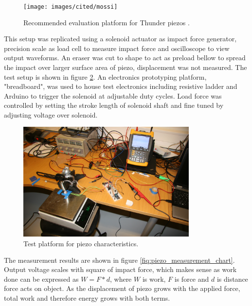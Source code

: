 \begin{figure}[htb]
  \begin{center}
  \texttt{[image: images/cited/mossi]}
  \end{center}
  \caption{Recommended evaluation platform for Thunder piezos \cite{Mossi}.}
  \label{fiq:thunder_eval}
\end{figure}

This setup was replicated using a solenoid actuator as impact force generator, precision scale as load cell to measure impact force and oscilloscope to view output waveforms. An eraser was cut to shape to act as preload bellow to spread the impact over larger surface area of piezo, displacement was not measured. The test setup is shown in figure \ref{fiq:piezo_impact}. An electronics prototyping platform, "breadboard", was used to house test electronics including resistive ladder and Arduino to trigger the solenoid at adjustable duty cycles. Load force was controlled by setting the stroke length of solenoid shaft and fine tuned by adjusting voltage over solenoid. 

\begin{figure}[htb]
  \begin{center}
  \includegraphics[height=6cm]{images/own_pic/piezo_test}
  \end{center}
  \caption{Test platform for piezo characteristics.}
  \label{fiq:piezo_impact}
\end{figure}

The measurement results are shown in figure \ref{fiq:piezo_measurement_chart}. Output voltage scales with square of impact force, which makes sense as work done can be expressed as $W = F * d$, where $W$ is work, $F$ is force and $d$ is distance force acts on object. As the displacement of piezo grows with the applied force, total work and therefore energy grows with both terms. 

